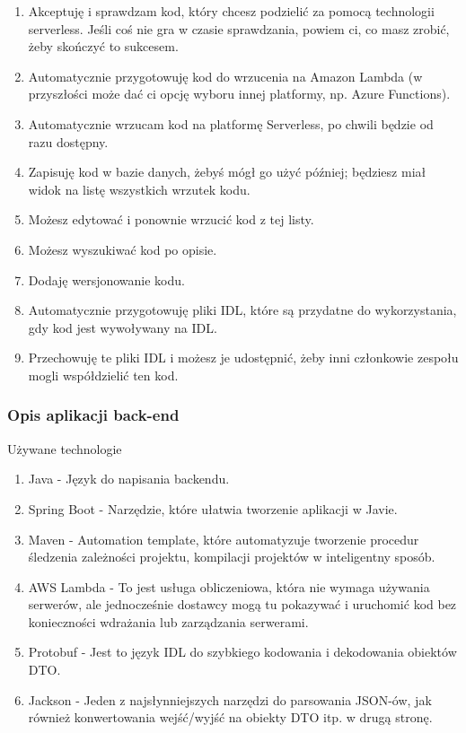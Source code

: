 \documentclass[runningheads,12pt]{llncs}
\begin{document}
\begin{enumerate}
    \item Akceptuję i sprawdzam kod, który chcesz podzielić za pomocą technologii serverless. Jeśli coś nie gra w czasie sprawdzania, powiem ci, co masz zrobić, żeby skończyć to sukcesem.
    \item Automatycznie przygotowuję kod do wrzucenia na Amazon Lambda (w przyszłości może dać ci opcję wyboru innej platformy, np. Azure Functions).
    \item Automatycznie wrzucam kod na platformę Serverless, po chwili będzie od razu dostępny.
    \item Zapisuję kod w bazie danych, żebyś mógł go użyć później; będziesz miał widok na listę wszystkich wrzutek kodu.
    \item Możesz edytować i ponownie wrzucić kod z tej listy.
    \item Możesz wyszukiwać kod po opisie.
    \item Dodaję wersjonowanie kodu.
    \item Automatycznie przygotowuję pliki IDL, które są przydatne do wykorzystania, gdy kod jest wywoływany na IDL.
    \item Przechowuję te pliki IDL i możesz je udostępnić, żeby inni członkowie zespołu mogli współdzielić ten kod.
\end{enumerate}

\subsubsection{Opis aplikacji back-end}

Używane technologie

\begin{enumerate}
    \item Java - Język do napisania backendu.
    \item Spring Boot - Narzędzie, które ułatwia tworzenie aplikacji w Javie.
    \item Maven - Automation template, które automatyzuje tworzenie procedur śledzenia zależności projektu, kompilacji projektów w inteligentny sposób.
    \item AWS Lambda - To jest usługa obliczeniowa, która nie wymaga używania serwerów, ale jednocześnie dostawcy mogą tu pokazywać i uruchomić kod bez konieczności wdrażania lub zarządzania serwerami.
    \item Protobuf - Jest to język IDL do szybkiego kodowania i dekodowania obiektów DTO.
    \item Jackson - Jeden z najsłynniejszych narzędzi do parsowania JSON-ów, jak również konwertowania wejść/wyjść na obiekty DTO itp. w drugą stronę.
\end{enumerate}
\end{document}
